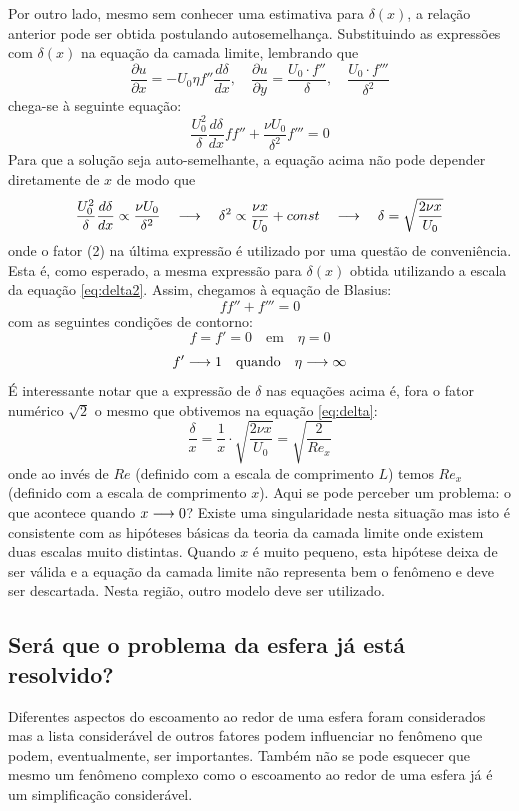 Por outro lado, mesmo sem conhecer uma estimativa para $\delta(x)$, a relação anterior pode ser obtida postulando autosemelhança. Substituindo as expressões com $\delta(x)$ na equação da camada limite, lembrando que 
\[
\frac{\partial u}{\partial x} = -U_0\eta f'' \frac{d\delta}{dx}, 
\quad \frac{\partial u}{\partial y} = \frac{U_0 \cdot f''}{\delta}, \quad \frac{U_0 \cdot f'''}{\delta^2}
\]
chega-se à seguinte equação:
\[
\frac{U_0^2}{\delta}\frac{d\delta}{dx} ff'' + \frac{\nu U_0}{\delta^2}f''' = 0
\]
Para que a solução seja auto-semelhante, a equação acima não pode depender diretamente de $x$ de modo que
\[
\frac{U_0^2}{\delta}\frac{d\delta}{dx} \propto \frac{\nu U_0}{\delta^2} \quad\longrightarrow\quad \delta^2 \propto \frac{\nu x}{U_0} + const \quad\longrightarrow\quad \delta = \sqrt{\frac{2 \nu x}{U_0}}
\]
onde o fator (2) na última expressão é utilizado por uma questão de conveniência. Esta é, como esperado, a mesma expressão para $\delta(x)$ obtida utilizando a escala da equação \ref{eq:delta2}. Assim, chegamos à equação de Blasius:
\[
ff'' + f''' = 0
\]
com as seguintes condições de contorno:
\[
f = f' = 0 \quad\text{em}\quad \eta = 0
\]
\[
f' \longrightarrow 1 \quad\text{quando}\quad \eta\longrightarrow\infty
\]
É interessante notar que a expressão de $\delta$ nas equações acima é, fora o fator numérico $\sqrt{2}$ o mesmo que obtivemos na equação \ref{eq:delta}:
\[
\frac{\delta}{x} = \frac{1}{x}\cdot \sqrt{\frac{2 \nu x}{U_0}} = \sqrt{\frac{2}{Re_x}}
\]
onde ao invés de $Re$ (definido com a escala de comprimento $L$) temos $Re_x$ (definido com a escala de comprimento $x$). Aqui se pode perceber um problema: o que acontece quando $x\longrightarrow 0$? Existe uma singularidade nesta situação  mas isto é consistente com as hipóteses básicas da teoria da camada limite onde existem duas escalas muito distintas. Quando $x$ é muito pequeno, esta hipótese deixa de ser válida e a equação da camada limite não representa bem o fenômeno e deve ser descartada. Nesta região, outro modelo deve ser utilizado.



\subsection{Será que o problema da esfera já está resolvido?}

Diferentes aspectos do escoamento ao redor de uma esfera foram considerados mas a lista considerável de outros fatores podem influenciar no fenômeno que podem, eventualmente, ser importantes. Também não se pode esquecer que mesmo um fenômeno complexo como o escoamento ao redor de uma esfera já é um simplificação considerável. 

